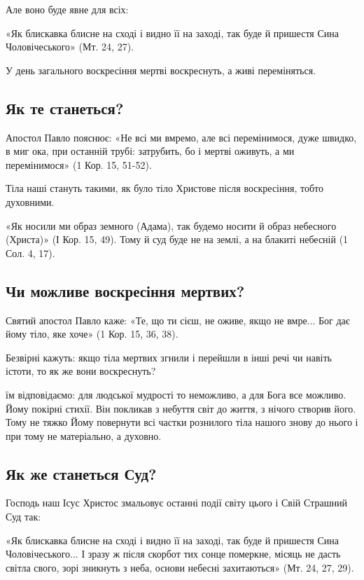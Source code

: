 \documentclass[main.tex]{subfiles}
\begin{document}
Але воно буде явне для всіх:

«Як блискавка блисне на сході і видно її на заході, так буде й пришестя Сина Чоловічеського» (Мт. 24, 27).

У день загального воскресіння мертві воскреснуть, а живі переміняться.

\subsection{Як те станеться?}

Апостол Павло пояснює: «Не всі ми вмремо, але всі перемінимося, дуже швидко, в миг ока, при останній трубі: затрубить, бо і мертві оживуть, а ми перемінимося» (1 Кор. 15, 51-52).

Тіла наші стануть такими, як було тіло Христове після воскресіння, тобто духовними.

«Як носили ми образ земного (Адама), так будемо носити й образ небесного (Христа)» (І Кор. 15, 49). Тому й суд буде не на землі, а на блакиті небесній (1 Сол. 4, 17).

\subsection{Чи можливе воскресіння мертвих?}

Святий апостол Павло каже: «Те, що ти сієш, не оживе, якщо не вмре... Бог дає йому тіло, яке хоче» (1 Кор. 15, 36, 38).

Безвірні кажуть: якщо тіла мертвих згнили і перейшли в інші речі чи навіть істоти, то як же вони воскреснуть?

їм відповідаємо: для людської мудрості то неможливо, а для Бога все можливо. Йому покірні стихії. Він покликав з небуття світ до життя, з нічого створив його. Тому не тяжко Йому повернути всі частки рознилого тіла нашого знову до нього і при тому не матеріально, а духовно.

\subsection{Як же станеться Суд?}

Господь наш Ісус Христос змальовує останні події світу цього і Свій Страшний Суд так:

«Як блискавка блисне на сході і видно її на заході, так буде й пришестя Сина Чоловічеського... І зразу ж після скорбот тих сонце померкне, місяць не дасть світла свого, зорі зникнуть з неба, основи небесні захитаються» (Мт. 24, 27, 29).
\end{document}
